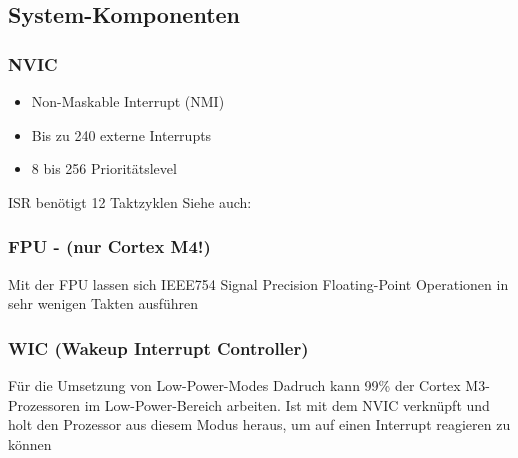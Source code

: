 \subsection{System-Komponenten}
\begin{multicols}{2}
\begin{minipage}{\linewidth}
    \subsubsection{NVIC}
    \begin{itemize}
    \item Non-Maskable Interrupt (NMI)
    \item Bis zu 240 externe Interrupts
    \item 8 bis 256 Prioritätslevel
    \end{itemize}
    \rightarrow ISR benötigt 12 Taktzyklen\newline
    Siehe auch:\\
\end{minipage}
\begin{minipage}{\linewidth}
    \subsubsection{FPU - (nur Cortex M4!)}
    Mit der FPU lassen sich IEEE754 Signal Precision Floating-Point Operationen in sehr wenigen Takten ausführen\\
\end{minipage}
\begin{minipage}{\linewidth}
    \subsubsection{WIC (Wakeup Interrupt Controller)}
    Für die Umsetzung von Low-Power-Modes\newline
    Dadruch kann 99\% der Cortex M3-Prozessoren im Low-Power-Bereich arbeiten.
    \newline
    Ist mit dem NVIC verknüpft und holt den Prozessor aus diesem Modus heraus, um auf einen Interrupt reagieren zu können\\
\end{minipage}
\begin{minipage}{\linewidth}

\end{minipage}
\end{multicols}
